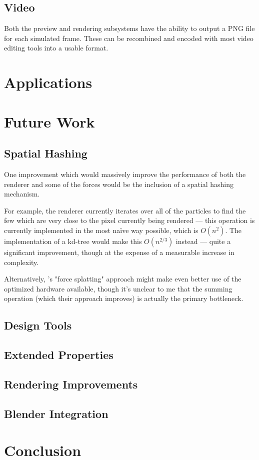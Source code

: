 \documentclass{acmsiggraph}
\begin{document}
\subsection{Video}

Both the preview and rendering subsystems have the ability to output a PNG file for each simulated frame. These can be recombined and encoded with most video editing tools into a usable format.

\section{Applications}

\section{Future Work}

\subsection{Spatial Hashing}

One improvement which would massively improve the performance of both the renderer and some of the forces would be the inclusion of a spatial hashing mechanism.

For example, the renderer currently iterates over all of the particles to find the few which are very close to the pixel currently being rendered --- this operation is currently implemented in the most na\"{i}ve way possible, which is $O(n^2)$. The implementation of a kd-tree would make this $O(n^{2/3})$ instead --- quite a significant improvement, though at the expense of a measurable increase in complexity.

Alternatively, \cite{1281670}'s "force splatting" approach might make even better use of the optimized hardware available, though it's unclear to me that the summing operation (which their approach improves) is actually the primary bottleneck.

\subsection{Design Tools}

\subsection{Extended Properties}

\subsection{Rendering Improvements}

\subsection{Blender Integration}

\section{Conclusion}


\nocite{*}

\end{document}
